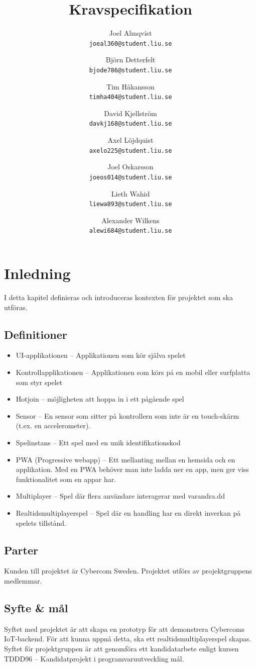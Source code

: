 \documentclass[10pt]{article}
\title{Kravspecifikation}
\author{
    Joel Almqvist\\
    \texttt{joeal360@student.liu.se}
    \and
    Björn Detterfelt\\
    \texttt{bjode786@student.liu.se}
    \and
    Tim Håkansson\\
    \texttt{timha404@student.liu.se}
    \and
    David Kjellström\\
    \texttt{davkj168@student.liu.se}
    \and
    Axel Löjdquist\\
    \texttt{axelo225@student.liu.se}
    \and
    Joel Oskarsson\\
    \texttt{joeos014@student.liu.se}
    \and
    Lieth Wahid\\
    \texttt{liewa893@student.liu.se}
    \and
    Alexander Wilkens\\
    \texttt{alewi684@student.liu.se}
}
\begin{document}
\maketitle
\pagebreak
\tableofcontents
\pagebreak
\section{Inledning}
	I detta kapitel definieras och introduceras kontexten för projektet som ska utföras.

	\subsection{Definitioner}
		\begin{itemize}
		\item UI-applikationen -- Applikationen som kör själva spelet
		\item Kontrollapplikationen -- Applikationen som körs på en mobil eller surfplatta som styr spelet
		\item Hotjoin -- möjligheten att hoppa in i ett pågående spel
		\item Sensor -- En sensor som sitter på kontrollern som inte är en touch-skärm (t.ex. en accelerometer).
		\item Spelinstans -- Ett spel med en unik identifikationskod
		\item PWA (Progressive webapp) -- Ett mellanting mellan en hemsida och en applikation. Med en PWA behöver man inte ladda ner en app, men ger viss funktionalitet som en appar har.
        \item Multiplayer -- Spel där flera användare interagerar med varandra.dd
		\item Realtidsmultiplayerspel -- Spel där en handling har en direkt inverkan på spelets tillstånd.
		\end{itemize}	

	\subsection{Parter}
	Kunden till projektet är Cybercom Sweden. Projektet utförs av projektgruppens medlemmar.
	
	\subsection{Syfte \& mål}
		Syftet med projektet är att skapa en prototyp för att demonstrera Cybercoms IoT-backend. För att kunna uppnå detta, ska ett realtidsmultiplayerspel skapas. Syftet för projektgruppen är att genomföra ett kandidatarbete enligt kursen TDDD96 -- Kandidatprojekt i programvaruutveckling mål.
	
\end{document}
